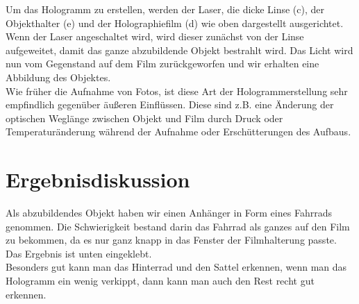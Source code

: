 Um das Hologramm zu erstellen, werden der Laser, die dicke Linse (c), der Objekthalter (e) und der Holographiefilm (d) wie oben dargestellt ausgerichtet. \\
Wenn der Laser angeschaltet wird, wird dieser zunächst von der Linse aufgeweitet, damit das ganze abzubildende Objekt bestrahlt wird. Das Licht wird nun vom Gegenstand auf dem Film zurückgeworfen und wir erhalten eine Abbildung des Objektes. \\
Wie früher die Aufnahme von Fotos, ist diese Art der Hologrammerstellung sehr empfindlich gegenüber äußeren Einflüssen. Diese sind z.B. eine Änderung der optischen Weglänge zwischen Objekt und Film durch Druck oder Temperaturänderung während der Aufnahme oder Erschütterungen des Aufbaus. 


\section{Ergebnisdiskussion}

Als abzubildendes Objekt haben wir einen Anhänger in Form eines Fahrrads genommen. Die Schwierigkeit bestand darin das Fahrrad als ganzes auf den Film zu bekommen, da es nur ganz knapp in das Fenster der Filmhalterung passte. Das Ergebnis ist unten eingeklebt. \\
Besonders gut kann man das Hinterrad und den Sattel erkennen, wenn man das Hologramm ein wenig verkippt, dann kann man auch den Rest recht gut erkennen.





